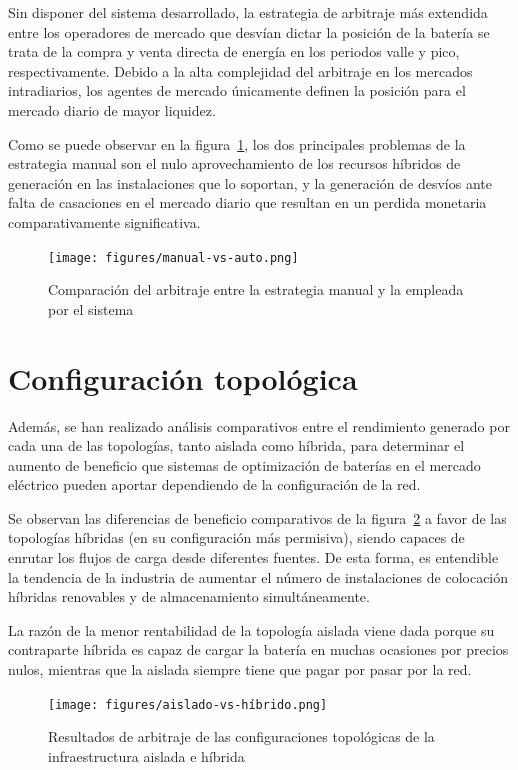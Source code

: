 Sin disponer del sistema desarrollado, la estrategia de arbitraje más extendida entre los operadores de mercado que desvían dictar la posición de la batería se trata de la compra y venta directa de energía en los periodos valle y pico, respectivamente. Debido a la alta complejidad del arbitraje en los mercados intradiarios, los agentes de mercado únicamente definen la posición para el mercado diario de mayor liquidez.

Como se puede observar en la figura~\ref{fig:manual-vs-auto}, los dos principales problemas de la estrategia manual son el nulo aprovechamiento de los recursos híbridos de generación en las instalaciones que lo soportan, y la generación de desvíos ante falta de casaciones en el mercado diario que resultan en un perdida monetaria comparativamente significativa.

\begin{figure}
  \centering
  \texttt{[image: figures/manual-vs-auto.png]}
  \caption{Comparación del arbitraje entre la estrategia manual y la empleada por el sistema}
  \label{fig:manual-vs-auto}
\end{figure}

\section{Configuración topológica}
\label{makereference7.3}

Además, se han realizado análisis comparativos entre el rendimiento generado por cada una de las topologías, tanto aislada como híbrida, para determinar el aumento de beneficio que sistemas de optimización de baterías en el mercado eléctrico pueden aportar dependiendo de la configuración de la red.

Se observan las diferencias de beneficio comparativos de la figura~\ref{fig:aislado-vs-híbrido} a favor de las topologías híbridas (en su configuración más permisiva), siendo capaces de enrutar los flujos de carga desde diferentes fuentes. De esta forma, es entendible la tendencia de la industria de aumentar el número de instalaciones de colocación híbridas renovables y de almacenamiento simultáneamente.

La razón de la menor rentabilidad de la topología aislada viene dada porque su contraparte híbrida es capaz de cargar la batería en muchas ocasiones por precios nulos, mientras que la aislada siempre tiene que pagar por pasar por la red.

\begin{figure}
  \centering
  \texttt{[image: figures/aislado-vs-híbrido.png]}
  \caption{Resultados de arbitraje de las configuraciones topológicas de la infraestructura aislada e híbrida}
  \label{fig:aislado-vs-híbrido}
\end{figure}

